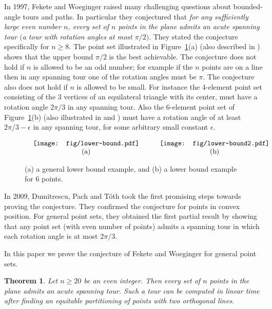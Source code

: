 \documentclass[11pt,letter]{article}
\newtheorem{theorem}{Theorem}
\begin{document}
In 1997, Fekete and Woeginger \cite{Fekete1997} raised many challenging questions about bounded-angle tours and paths. In particular they conjectured that {\em for any sufficiently large even number $n$, every set of $n$ points in the plane admits an acute spanning tour $($a tour with rotation angles at most $\pi/2$$)$}. They stated the conjecture specifically for $n\geqslant 8$. The point set illustrated in Figure~\ref{lower-bound-fig}(a) (also described in \cite{Fekete1997}) shows that the upper bound $\pi/2$ is the best achievable. The conjecture does not hold if $n$ is allowed to be an odd number; for example if the $n$ points are on a line then in any spanning tour one of the rotation angles must be $\pi$. The conjecture also does not hold if $n$ is allowed to be small. For instance the 4-element point set consisting of the 3 vertices of an equilateral triangle with its center, must have a rotation angle $2\pi/3$ in any spanning tour. Also the 6-element point set of Figure~\ref{lower-bound-fig}(b) (also illustrated in \cite{Fekete1997} and \cite{Dumitrescu12}) must have a rotation angle of at least $2\pi/3-\epsilon$ in any spanning tour, for some arbitrary small constant $\epsilon$. 


\begin{figure}[htb]
	\centering
	\setlength{\tabcolsep}{0in}
	$\begin{tabular}{cc}
		\multicolumn{1}{m{.47\columnwidth}}{\centering\texttt{[image: fig/lower-bound.pdf]}}
		&\multicolumn{1}{m{.53\columnwidth}}{\centering\vspace{0pt}\texttt{[image: fig/lower-bound2.pdf]}}	
		\\
		(a) &(b)  
	\end{tabular}$
	\caption{(a) a general lower bound example, and (b) a lower bound example for $6$ points.}
	\label{lower-bound-fig}
\end{figure}


In 2009, Dumitrescu, Pach and T{\'{o}}th \cite{Dumitrescu12} took the first promising steps towards proving the conjecture. They confirmed the conjecture for points in convex position. For general point sets, they obtained the first partial result by showing that any point set (with even number of points) admits a spanning tour in which each rotation angle is at most $2\pi/3$. 

In this paper we prove the conjecture of Fekete and Woeginger for general point sets.

\begin{theorem}
	\label{main-thr}
	Let $n\geqslant 20$ be an even integer. Then every set of $n$ points in the plane admits an acute spanning tour. Such a tour can be computed in linear time after finding an equitable partitioning of points with two orthogonal lines.
\end{theorem}
\end{document}
